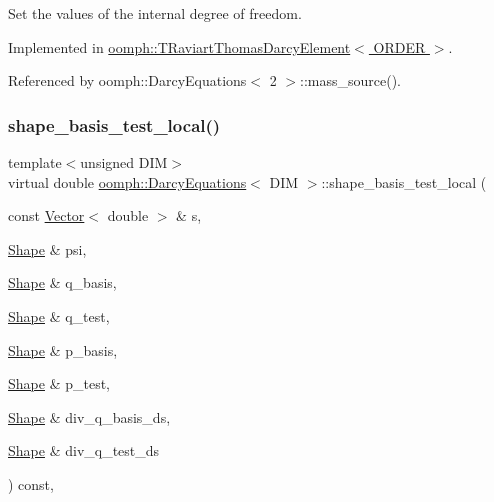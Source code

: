 Set the values of the internal degree of freedom. 



Implemented in \hyperlink{classoomph_1_1TRaviartThomasDarcyElement_a651973d516923c2c032f44dac1503b60}{oomph\+::\+T\+Raviart\+Thomas\+Darcy\+Element$<$ O\+R\+D\+E\+R $>$}.



Referenced by oomph\+::\+Darcy\+Equations$<$ 2 $>$\+::mass\+\_\+source().

\mbox{\label{classoomph_1_1DarcyEquations_a4052cf1c7cd03d9ea206f4cf885ef5ae}} 
\subsubsection{\texorpdfstring{shape\+\_\+basis\+\_\+test\+\_\+local()}{shape\_basis\_test\_local()}}
{\footnotesize\ttfamily template$<$unsigned D\+IM$>$ \\
virtual double \hyperlink{classoomph_1_1DarcyEquations}{oomph\+::\+Darcy\+Equations}$<$ D\+IM $>$\+::shape\+\_\+basis\+\_\+test\+\_\+local (\begin{DoxyParamCaption}\item[{const \hyperlink{classoomph_1_1Vector}{Vector}$<$ double $>$ \&}]{s,  }\item[{\hyperlink{classoomph_1_1Shape}{Shape} \&}]{psi,  }\item[{\hyperlink{classoomph_1_1Shape}{Shape} \&}]{q\+\_\+basis,  }\item[{\hyperlink{classoomph_1_1Shape}{Shape} \&}]{q\+\_\+test,  }\item[{\hyperlink{classoomph_1_1Shape}{Shape} \&}]{p\+\_\+basis,  }\item[{\hyperlink{classoomph_1_1Shape}{Shape} \&}]{p\+\_\+test,  }\item[{\hyperlink{classoomph_1_1Shape}{Shape} \&}]{div\+\_\+q\+\_\+basis\+\_\+ds,  }\item[{\hyperlink{classoomph_1_1Shape}{Shape} \&}]{div\+\_\+q\+\_\+test\+\_\+ds }\end{DoxyParamCaption}) const\hspace{0.3cm}{\ttfamily [protected]}, {}}



